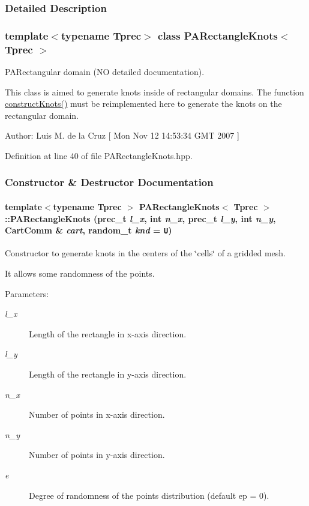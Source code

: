 \subsubsection{Detailed Description}
\subsubsection*{template$<$typename Tprec$>$ class PARectangleKnots$<$ Tprec $>$}

PARectangular domain (NO detailed documentation). 

This class is aimed to generate knots inside of rectangular domains. The function \hyperlink{classPARectangleKnots_3e8981078e760ca21870882bb3192846}{constructKnots()} must be reimplemented here to generate the knots on the rectangular domain. \begin{Desc}
\item[Author:]Luis M. de la Cruz \mbox{[} Mon Nov 12 14:53:34 GMT 2007 \mbox{]} \end{Desc}


Definition at line 40 of file PARectangleKnots.hpp.

\subsubsection{Constructor \& Destructor Documentation}
\hypertarget{classPARectangleKnots_d44ccc812d35593e03ed4fd60f82e1f1}{
\paragraph[{PARectangleKnots}]{\setlength{\rightskip}{0pt plus 5cm}template$<$typename Tprec $>$ {\bf PARectangleKnots}$<$ Tprec $>$::{\bf PARectangleKnots} (prec\_\-t {\em l\_\-x}, \/  int {\em n\_\-x}, \/  prec\_\-t {\em l\_\-y}, \/  int {\em n\_\-y}, \/  {\bf CartComm} \& {\em cart}, \/  random\_\-t {\em knd} = {\tt U})}\hfill}
\label{classPARectangleKnots_d44ccc812d35593e03ed4fd60f82e1f1}


Constructor to generate knots in the centers of the \char`\"{}cells\char`\"{} of a gridded mesh. 

It allows some randomness of the points. \begin{Desc}
\item[Parameters:]
\begin{description}
\item[{\em l\_\-x}]Length of the rectangle in x-axis direction. \item[{\em l\_\-y}]Length of the rectangle in y-axis direction. \item[{\em n\_\-x}]Number of points in x-axis direction. \item[{\em n\_\-y}]Number of points in y-axis direction. \item[{\em e}]Degree of randomness of the points distribution (default ep = 0). \end{description}
\end{Desc}


